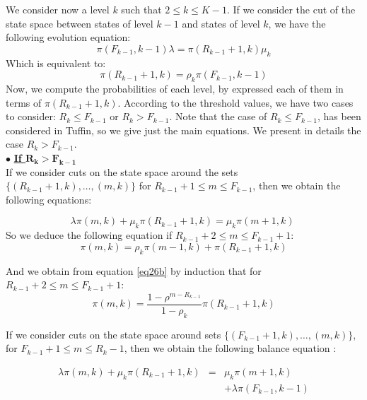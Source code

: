 \documentclass[conference]{IEEEtran}
\begin{document}
We consider now a level $k$ such that $2 \leq  k \leq K-1$. If we consider the cut  of the state space between states of level $k-1$ and states of level $k$,  we have   the following  evolution equation:
\begin{equation}
\pi(F_{k-1},k-1) \lambda=  \pi(R_{k-1}+1,k) \mu_k
\end{equation}
Which is equivalent to:
\begin{equation}
\pi(R_{k-1}+1,k)= \rho_k \pi(F_{k-1},k-1)
\label{eq14b}
\end{equation}
Now, we compute the probabilities of each level, by
expressed  each of them in terms of  $\pi(R_{k-1}+1,k)$. According to the threshold values,
we have two cases to consider:
$R_{k} \leq F_{k-1}$ or  $R_{k} > F_{k-1}$. Note that the case of $R_{k} \leq F_{k-1}$, has been considered in Tuffin, so we give just the main equations. We present in details the case $R_{k} > F_{k-1}$. \\
\noindent
$\bullet$ \underline{{\textbf{If $\mathbf{R_{k} > F_{k-1}}$ }}} \\
\noindent
If we consider cuts on the state space around the sets $\{(R_{k-1}+1,k), \ldots,(m,k)\}$ for  $R_{k-1}+1 \leq m \leq F_{k-1}$, then we obtain
the following equations: 

\begin{equation}
\lambda \pi(m,k) + \mu_k \pi(R_{k-1}+1,k) = \mu_k \pi(m+1,k) \; \label{eq9b}
\end{equation}
\noindent
So we deduce the following equation if $ R_{k-1}+2 \leq m \leq F_{k-1}+1$:
\begin{equation}
\pi(m,k) = \rho_k \pi(m-1,k)+ \pi(R_{k-1}+1,k)
\label{eq26b}
\end{equation}

\noindent And we obtain from equation \ref{eq26b} by induction that  for  $R_{k-1}+2 \leq m \leq F_{k-1}+1$:
\begin{equation}
\pi(m,k)=\frac{1-\rho^{m-R_{k-1}} }{1-\rho_k}\pi(R_{k-1}+1,k)
\label{eq40b}
 \end{equation}

\noindent
If we consider cuts on the state space around sets $\{(F_{k-1}+1,k),\ldots,(m,k)\}$, for  $F_{k-1}+1 \leq m \leq R_{k}-1$,
then we obtain the following balance equation : 

\begin{eqnarray}
\lambda \pi(m,k) + \mu_k \pi(R_{k-1}+1,k)&=&\mu_k \pi(m+1,k) \nonumber \\
&&+ \lambda \pi(F_{k-1},k-1)
 \label{eq12b}
\end{eqnarray}
\end{document}
